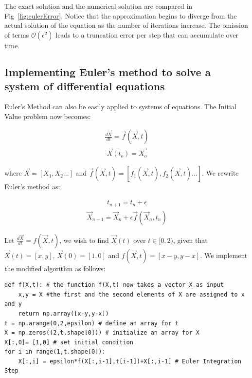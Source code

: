 \documentclass[10pt,letterpaper]{article}
\begin{document}
The exact solution and the numerical solution are compared in Fig~\ref{fig:eulerError}. Notice that the approximation begins to diverge from the actual solution of the equation as the number of iterations increase. The omission of terms $\mathcal{O}(\epsilon^2)$ leads to a truncation error per step that can accumulate over time. 

\subsection*{Implementing Euler's method to solve a system of differential equations}

Euler's Method can also be easily applied to systems of equations. The Initial Value problem now becomes:

\begin{eqnarray}\frac{d\vec{X}}{dt} = \vec{f}(\vec{X}, t)\end{eqnarray}
\begin{eqnarray}\vec{X}(t_o) = \vec{X_o}\end{eqnarray}

where $\vec{X}=[X_1,X_2...]$ and $\vec{f}(\vec{X}, t)=[f_1(\vec{X}, t),f_2(\vec{X}, t)...]$. We rewrite Euler's method as:

\begin{eqnarray}t_{n+1} = t_n + \epsilon \end{eqnarray}
\begin{eqnarray}\vec{X}_{n+1} = \vec{X}_n + \epsilon \vec{f}(\vec{X}_n, t_n)\end{eqnarray}

Let $\frac{d\vec{X}}{dt}=f(\vec{X},t)$, we wish to find $\vec{X}(t)$ over $t\in[0,2)$, given that $\vec{X}(t)=[x,y]$, $\vec{X}(0)=[1,0]$ and $f(\vec{X},t) = [x-y,y-x]$. We implement the modified algorithm as follows:

\begin{verbatim}
def f(X,t): # the function f(X,t) now takes a vector X as input
    x,y = X #the first and the second elements of X are assigned to x and y
    return np.array([x-y,y-x])
t = np.arange(0,2,epsilon) # define an array for t
X = np.zeros((2,t.shape[0])) # initialize an array for X
X[:,0]= [1,0] # set initial condition
for i in range(1,t.shape[0]):
    X[:,i] = epsilon*f(X[:,i-1],t[i-1])+X[:,i-1] # Euler Integration Step
\end{verbatim}
\end{document}
